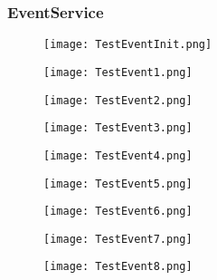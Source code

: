 \subsubsection{EventService}
\begin{figure}[h!]
    \begin{center}
        \texttt{[image: TestEventInit.png]}
    \end{center}
\end{figure}
\begin{figure}[h!]
    \begin{center}
        \texttt{[image: TestEvent1.png]}
    \end{center}
\end{figure}
\begin{figure}[h!]
    \begin{center}
        \texttt{[image: TestEvent2.png]}
    \end{center}
\end{figure}
\begin{figure}[h!]
    \begin{center}
        \texttt{[image: TestEvent3.png]}
    \end{center}
\end{figure}
\begin{figure}[h!]
    \begin{center}
        \texttt{[image: TestEvent4.png]}
    \end{center}
\end{figure}
\begin{figure}[h!]
    \begin{center}
        \texttt{[image: TestEvent5.png]}
    \end{center}
\end{figure}
\begin{figure}[h!]
    \begin{center}
        \texttt{[image: TestEvent6.png]}
    \end{center}
\end{figure}
\begin{figure}[h!]
    \begin{center}
        \texttt{[image: TestEvent7.png]}
    \end{center}
\end{figure}
\begin{figure}[h!]
    \begin{center}
        \texttt{[image: TestEvent8.png]}
    \end{center}
\end{figure}
